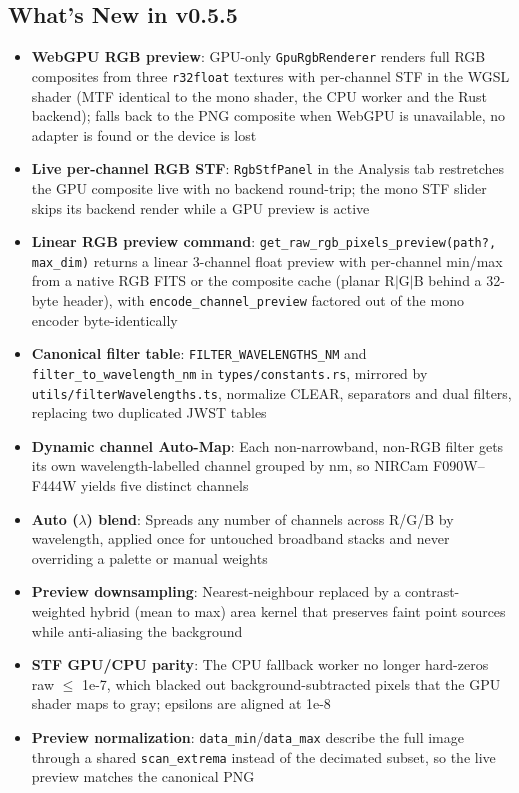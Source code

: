 \documentclass[11pt,a4paper]{article}
\newcommand{\code}[1]{\texttt{\small #1}}
\begin{document}
    \subsection{What's New in v0.5.5}
    \begin{itemize}[nosep]
    \item \textbf{WebGPU RGB preview}: GPU-only \code{GpuRgbRenderer} renders full RGB composites from three \code{r32float} textures with per-channel STF in the WGSL shader (MTF identical to the mono shader, the CPU worker and the Rust backend); falls back to the PNG composite when WebGPU is unavailable, no adapter is found or the device is lost
    \item \textbf{Live per-channel RGB STF}: \code{RgbStfPanel} in the Analysis tab restretches the GPU composite live with no backend round-trip; the mono STF slider skips its backend render while a GPU preview is active
    \item \textbf{Linear RGB preview command}: \code{get\_raw\_rgb\_pixels\_preview(path?, max\_dim)} returns a linear 3-channel float preview with per-channel min/max from a native RGB FITS or the composite cache (planar R$|$G$|$B behind a 32-byte header), with \code{encode\_channel\_preview} factored out of the mono encoder byte-identically
    \item \textbf{Canonical filter table}: \code{FILTER\_WAVELENGTHS\_NM} and \code{filter\_to\_wavelength\_nm} in \code{types/constants.rs}, mirrored by \code{utils/filterWavelengths.ts}, normalize CLEAR, separators and dual filters, replacing two duplicated JWST tables
    \item \textbf{Dynamic channel Auto-Map}: Each non-narrowband, non-RGB filter gets its own wavelength-labelled channel grouped by nm, so NIRCam F090W--F444W yields five distinct channels
    \item \textbf{Auto ($\lambda$) blend}: Spreads any number of channels across R/G/B by wavelength, applied once for untouched broadband stacks and never overriding a palette or manual weights
    \item \textbf{Preview downsampling}: Nearest-neighbour replaced by a contrast-weighted hybrid (mean to max) area kernel that preserves faint point sources while anti-aliasing the background
    \item \textbf{STF GPU/CPU parity}: The CPU fallback worker no longer hard-zeros raw $\le$ 1e-7, which blacked out background-subtracted pixels that the GPU shader maps to gray; epsilons are aligned at 1e-8
    \item \textbf{Preview normalization}: \code{data\_min}/\code{data\_max} describe the full image through a shared \code{scan\_extrema} instead of the decimated subset, so the live preview matches the canonical PNG

\end{itemize}
\end{document}
